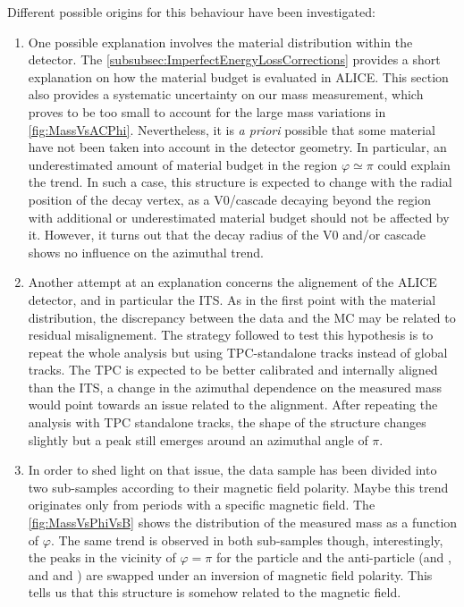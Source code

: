 Different possible origins for this  behaviour have been investigated:
\begin{enumerate}
\item One possible explanation involves the material distribution within the detector. The \Sec\ref{subsubsec:ImperfectEnergyLossCorrections} provides a short explanation on how the material budget is evaluated in ALICE. This section also provides a systematic uncertainty on our mass measurement, which proves to be too small to account for the large mass variations in \figs\ref{fig:MassVsACPhi}. Nevertheless, it is \textit{a priori} possible that some material have not been taken into account in the detector geometry. In particular, an underestimated amount of material budget in the region $\varphi \simeq \pi$ could explain the trend. In such a case, this structure is expected to change with the radial position of the decay vertex, as a V0/cascade decaying beyond the region with additional or underestimated material budget should not be affected by it. However, it turns out that the decay radius of the V0 and/or cascade shows no influence on the azimuthal trend.
\item Another attempt at an explanation concerns the alignement of the ALICE detector, and in particular the ITS. As in the first point with the material distribution, the discrepancy between the data and the MC may be related to residual misalignement. The strategy followed to test this hypothesis is to repeat the whole analysis but using TPC-standalone tracks instead of global tracks. The TPC is expected to be better calibrated and internally aligned than the ITS, a change in the azimuthal dependence on the measured mass would point towards an issue related to the alignment. After repeating the analysis with TPC standalone tracks, the shape of the structure changes slightly but a peak still emerges around an azimuthal angle of $\pi$.
\item In order to shed light on that issue, the data sample has been divided into two sub-samples according to their magnetic field polarity. Maybe this trend originates only from periods with a specific magnetic field. The \fig\ref{fig:MassVsPhiVsB} shows the distribution of the measured mass as a function of $\varphi$. The same trend is observed in both sub-samples though, interestingly, the peaks in the vicinity of $\varphi = \pi$  for the particle and the anti-particle (\rmLambda and \rmAlambda, and \rmXiM and \rmAxiP) are swapped under an inversion of magnetic field polarity. This tells us that this structure is somehow related to the magnetic field.

\end{enumerate}

